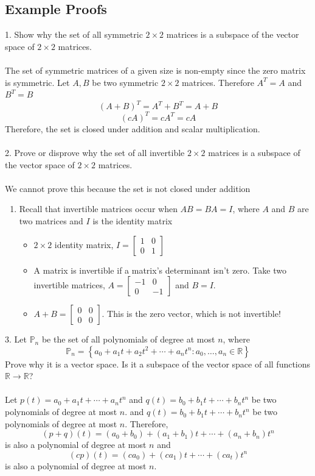 \subsection{Example Proofs}
1. Show why the set of all symmetric $2 \times 2$ matrices is a subspace of the vector space 
of $2 \times 2$ matrices. \\\\
The set of symmetric matrices of a given size is non-empty since the zero matrix is symmetric. 
Let $A, B$ be two symmetric $2 \times 2$ matrices. Therefore $A^T = A$ and $B^T = B$ 
\[
  (A + B)^T = A^T + B^T = A + B
\]
\[
  (cA)^T = cA^T = cA
\]
Therefore, the set is closed under addition and scalar multiplication. \\\\
2. Prove or disprove why the set of all invertible $2 \times 2$ matrices is a subspace 
of the vector space of $2 \times 2$ matrices. \\\\
We cannot prove this because the set is not closed under addition
\begin{enumerate}
  \item Recall that invertible matrices occur when $AB = BA = I$, where $A$ and $B$ are 
    two matrices and $I$ is the identity matrix
    \begin{itemize}
      \item $2 \times 2$ identity matrix, $I = \begin{bmatrix} 1 & 0 \\ 0 & 1 \end{bmatrix}$
      \item A matrix is invertible if a matrix's determinant isn't zero. 
        Take two invertible matrices, $A = \begin{bmatrix} -1 & 0 \\ 0 & -1 \end{bmatrix}$
        and $B = I$. 
      \item $A + B = \begin{bmatrix} 0 & 0 \\ 0 & 0 \end{bmatrix}$. 
        This is the zero vector, which is not invertible!
    \end{itemize}
\end{enumerate}
3. Let $\mathbb{P}_n$ be the set of all polynomials of degree at most $n$, where 
\[
  \mathbb{P}_n = \left\{a_0 + a_1t + a_2t^2 + \cdots + a_nt^n 
    : a_0, \dots, a_n \in \mathbb{R}\right\}
\]
Prove why it is a vector space. Is it a subspace of the vector space of all functions 
$\mathbb{R} \rightarrow \mathbb{R}$?
\\\\ Let $p(t) = a_0 + a_1t + \cdots + a_nt^n$ and $q(t) = b_0 + b_1t + \cdots + b_nt^n$ 
be two polynomials of degree at most $n$. and $q(t) = b_0 + b_1t + \cdots + b_nt^n$ be 
two polynomials of degree at most $n$. Therefore, 
\[
  (p + q)(t) = (a_0 + b_0) + (a_1 + b_1)t + \cdots + (a_n + b_n)t^n 
\] is also a polynomial of degree at most $n$ and 
\[
  (cp)(t) = (ca_0) + (ca_1)t + \cdots + (ca_t)t^n
\] is also a polynomial of degree at most $n$. 
